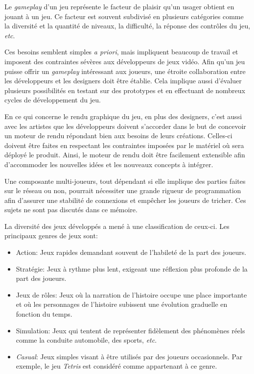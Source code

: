 \documentclass[12pt,twoside,letterpaper,francais]{book}
\begin{document}
Le \textit{gameplay} d'un jeu représente le facteur de plaisir qu'un
usager obtient en jouant à un jeu. Ce facteur est souvent subdivisé en
plusieurs catégories comme la diversité et la quantité de niveaux, la
difficulté, la réponse des contrôles du jeu, \textit{etc}.

Ces besoins semblent simples \textit{a priori}, mais impliquent
beaucoup de travail et imposent des contraintes sévères aux
développeurs de jeux vidéo. Afin qu'un jeu puisse offrir un
\textit{gameplay} intéressant aux joueurs, une étroite collaboration
entre les développeurs et les designers doit être établie. Cela
implique aussi d'évaluer plusieurs possibilités en testant sur des
prototypes et en effectuant de nombreux cycles de dévelop\-pement du
jeu.

En ce qui concerne le rendu graphique du jeu, en plus des designers,
c'est aussi avec les artistes que les développeurs doivent s'accorder
dans le but de concevoir un moteur de rendu répondant bien aux besoins
de leurs créations. Celles-ci doivent être faites en respectant les
contraintes imposées par le matériel où sera déployé le
produit. Ainsi, le moteur de rendu doit être facilement extensible
afin d'accommoder les nouvelles idées et les nouveaux concepts à
intégrer.

Une composante multi-joueurs, tout dépendant si elle implique des
parties faites sur le réseau ou non, pourrait nécessiter une grande
rigueur de programmation afin d'assurer une stabilité de connexions
et empêcher les joueurs de tricher. Ces sujets ne sont pas discutés
dans ce mémoire.

La diversité des jeux développés a mené à une classification de
ceux-ci. Les principaux genres de jeux sont:

\begin{itemize}
\item Action: Jeux rapides demandant souvent de l'habileté de la part
  des joueurs.
\item Stratégie: Jeux à rythme plus lent, exigeant une réflexion plus
  profonde de la part des joueurs.
\item Jeux de rôles: Jeux où la narration de l'histoire occupe une
  place importante et où les personnages de l'histoire subissent une
  évolution graduelle en fonction du temps.
\item Simulation: Jeux qui tentent de représenter fidèlement des
  phénomènes réels comme la conduite automobile, des sports,
  \textit{etc}.
\item \textit{Casual}: Jeux simples visant à être utilisés par des
  joueurs occasionnels. Par exemple, le jeu \textit{Tetris} est
  considéré comme appartenant à ce genre.
\end{itemize}
\end{document}

